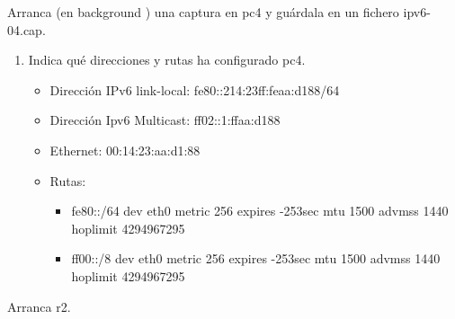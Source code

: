 \documentclass[12pt, a4paper]{report}
\begin{document}
Arranca (en background ) una captura en pc4 y guárdala en un fichero ipv6-04.cap.\\
\begin{enumerate}
	\item Indica qué direcciones y rutas ha configurado pc4.
	\begin{itemize}
		\item Dirección IPv6 link-local: fe80::214:23ff:feaa:d188/64
		\item Dirección Ipv6 Multicast: ff02::1:ffaa:d188
		\item Ethernet: 00:14:23:aa:d1:88
		\item Rutas:
		\begin{itemize}
			\item fe80::/64 dev eth0  metric 256  expires -253sec mtu 1500 advmss 1440 hoplimit 4294967295
			\item ff00::/8 dev eth0  metric 256  expires -253sec mtu 1500 advmss 1440 hoplimit 4294967295
		\end{itemize}
	\end{itemize}
\end{enumerate}
Arranca r2.
\end{document}
